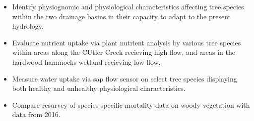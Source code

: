 \documentclass[
]{article}
\providecommand{\tightlist}{%
  \setlength{\itemsep}{0pt}\setlength{\parskip}{0pt}}
\begin{document}
\begin{itemize}
\tightlist
\item
  Identify physiognomic and physiological characteristics affecting tree
  species within the two drainage basins in their capacity to adapt to
  the present hydrology.\\
\item
  Evaluate nutrient uptake via plant nutrient analysis by various tree
  species within areas along the CUtler Creek recieving high flow, and
  areas in the hardwood hammocks wetland recieving low flow.\\
\item
  Measure water uptake via sap flow sensor on select tree species
  displaying both healthy and unhealthy physiological characteristics.\\
\item
  Compare resurvey of species-specific mortality data on woody
  vegetation with data from 2016.
\end{itemize}
\end{document}
